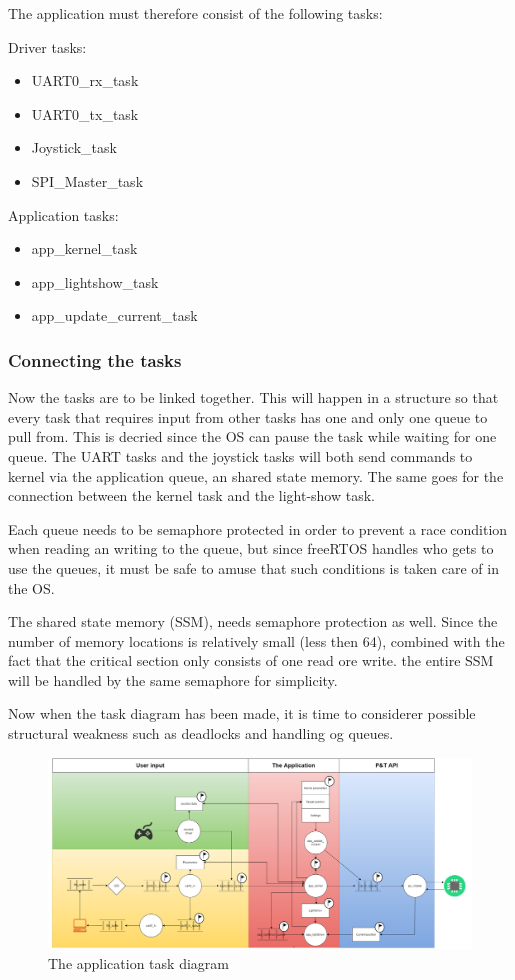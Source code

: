 The application must therefore consist of the following tasks:

Driver tasks:
\begin{itemize}[noitemsep]
	\item UART0\_rx\_task
	\item UART0\_tx\_task
	\item Joystick\_task
	\item SPI\_Master\_task
\end{itemize}

Application tasks:
\begin{itemize}[noitemsep]
	\item app\_kernel\_task
	\item app\_lightshow\_task
	\item app\_update\_current\_task
\end{itemize}	
	
\subsubsection{Connecting the tasks}
Now the tasks are to be linked together. This will happen in a structure so that every task that requires input from other tasks has one and only one queue to pull from. This is decried since the OS can pause the task while waiting for one queue. The UART tasks and the joystick tasks will both send commands to kernel via the application queue, an shared state memory. The same goes for the connection between the kernel task and the light-show task. 

Each queue needs to be semaphore protected in order to prevent a race condition when reading an writing to the queue, but since freeRTOS handles who gets to use the queues, it must be safe to amuse that such conditions is taken care of in the OS. 

The shared state memory (SSM), needs semaphore protection as well. Since the number of memory locations is relatively small (less then 64), combined with the fact that the critical section only consists of one read ore write. the entire SSM will be handled by the same semaphore for simplicity. 



Now when the task diagram has been made, it is time to considerer possible structural weakness such as deadlocks and handling og queues. 

\begin{figure}
	\centering
	\includegraphics[scale= 0.4, angle = 90] {Billeder/microcontroller-Task-Diagram}
	\caption{The application task diagram}
	\label{fig:applicaiton_task_diagram}
\end{figure}




